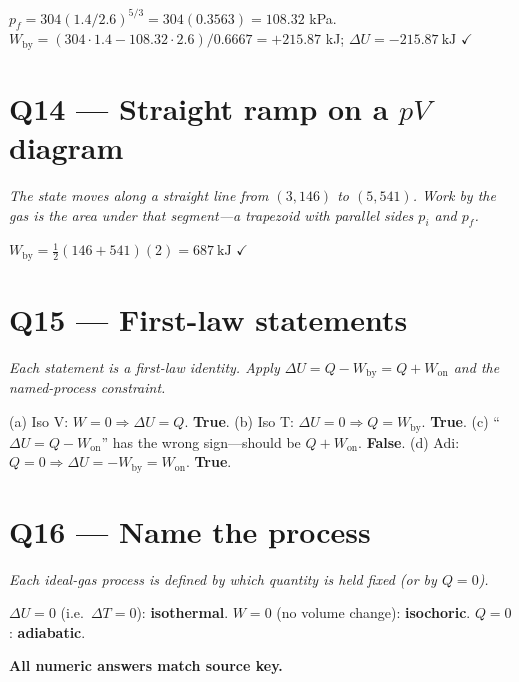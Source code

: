 \documentclass[11pt]{article}
\newcommand{\checkmk}{\ensuremath{\checkmark}}
\begin{document}
$p_f = 304(1.4/2.6)^{5/3} = 304(0.3563) = 108.32$ kPa.
$W_{\text{by}} = (304\cdot 1.4 - 108.32\cdot 2.6)/0.6667 = +215.87$ kJ; $\Delta U = \boxed{-215.87\ \text{kJ}}$ \checkmk

\section*{Q14 --- Straight ramp on a $pV$ diagram}
\emph{The state moves along a straight line from $(3, 146)$ to $(5, 541)$. Work by the gas is the area under that segment---a trapezoid with parallel sides $p_i$ and $p_f$.}

$W_{\text{by}} = \tfrac12(146+541)(2) = \boxed{687\ \text{kJ}}$ \checkmk

\section*{Q15 --- First-law statements}
\emph{Each statement is a first-law identity. Apply $\Delta U = Q - W_{\text{by}} = Q + W_{\text{on}}$ and the named-process constraint.}

(a) Iso V: $W=0 \Rightarrow \Delta U = Q$. \textbf{True}.
(b) Iso T: $\Delta U = 0 \Rightarrow Q = W_{\text{by}}$. \textbf{True}.
(c) ``$\Delta U = Q - W_{\text{on}}$'' has the wrong sign---should be $Q + W_{\text{on}}$. \textbf{False}.
(d) Adi: $Q=0 \Rightarrow \Delta U = -W_{\text{by}} = W_{\text{on}}$. \textbf{True}.

\section*{Q16 --- Name the process}
\emph{Each ideal-gas process is defined by which quantity is held fixed (or by $Q=0$).}

$\Delta U = 0$ (i.e.\ $\Delta T = 0$): \textbf{isothermal}. $W = 0$ (no volume change): \textbf{isochoric}. $Q = 0$: \textbf{adiabatic}.

\bigskip\noindent\textbf{All numeric answers match source key.}
\end{document}

